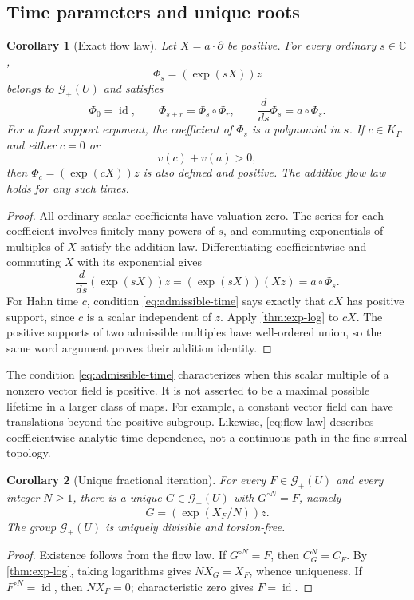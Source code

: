 \documentclass[11pt,letterpaper]{article}
\newtheorem{corollary}[corollary]{Corollary}
\theoremstyle{definition}
\theoremstyle{remark}
\newcommand{\C}{\mathbb C}
\newcommand{\GG}{\mathscr G}
\newcommand{\id}{\operatorname{id}}
\numberwithin{equation}{section}
\begin{document}
\subsection{Time parameters and unique roots}
\begin{corollary}[Exact flow law]\label{cor:flow}
Let $X=a\cdot\partial$ be positive. For every ordinary $s\in\C$,
\[
 \Phi_s=(\exp(sX))z
\]
belongs to $\GG_+(U)$ and satisfies
\begin{equation}\label{eq:flow-law}
 \Phi_0=\id,\qquad
 \Phi_{s+r}=\Phi_s\circ\Phi_r,\qquad
 \frac{d}{ds}\Phi_s=a\circ\Phi_s.
\end{equation}
For a fixed support exponent, the coefficient of $\Phi_s$ is a polynomial in
$s$. If $c\in K_\Gamma$ and either $c=0$ or
\begin{equation}\label{eq:admissible-time}
 v(c)+v(a)>0,
\end{equation}
then $\Phi_c=(\exp(cX))z$ is also defined and positive. The additive flow
law holds for any such times.
\end{corollary}
\begin{proof}
All ordinary scalar coefficients have valuation zero. The series for each
coefficient involves finitely many powers of $s$, and commuting exponentials
of multiples of $X$ satisfy the addition law. Differentiating coefficientwise
and commuting $X$ with its exponential gives
\[
 \frac{d}{ds}(\exp(sX))z=(\exp(sX))(Xz)
                         =a\circ\Phi_s.
\]
For Hahn time $c$, condition \eqref{eq:admissible-time} says exactly that
$cX$ has positive support, since $c$ is a scalar independent of $z$.
Apply \cref{thm:exp-log} to $cX$. The positive supports of two admissible
multiples have well-ordered union, so the same word argument proves their
addition identity.
\end{proof}
The condition \eqref{eq:admissible-time} characterizes when this scalar
multiple of a nonzero vector field is positive. It is not asserted to be a
maximal possible lifetime in a larger class of maps. For example, a constant
vector field can have translations beyond the positive subgroup.
Likewise, \eqref{eq:flow-law} describes coefficientwise analytic time
dependence, not a continuous path in the fine surreal topology.

\begin{corollary}[Unique fractional iteration]\label{cor:roots}
For every $F\in\GG_+(U)$ and every integer $N\ge1$, there is a unique
$G\in\GG_+(U)$ with $G^{\circ N}=F$, namely
\[
 G=(\exp(X_F/N))z.
\]
The group $\GG_+(U)$ is uniquely divisible and torsion-free.
\end{corollary}
\begin{proof}
Existence follows from the flow law. If $G^{\circ N}=F$, then
$C_G^N=C_F$. By \cref{thm:exp-log}, taking logarithms gives
$N X_G=X_F$, whence uniqueness. If $F^{\circ N}=\id$, then $NX_F=0$;
characteristic zero gives $F=\id$.
\end{proof}
\end{document}
